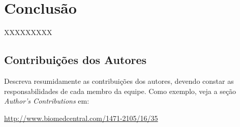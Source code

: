 \documentclass[12pt]{article}
\begin{document}
\section{Conclusão}

XXXXXXXXX

\subsection*{Contribuições dos Autores}

Descreva resumidamente as contribuições dos autores,  devendo constar as responsabilidades de cada membro da equipe. Como exemplo, veja a seção {\em Author’s Contributions} em:

\url{http://www.biomedcentral.com/1471-2105/16/35}
\end{document}
